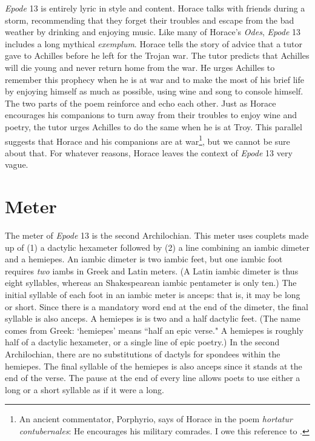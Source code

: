 \textit{Epode} 13 is entirely lyric in style and content.  Horace talks with friends during a storm, recommending that they forget their troubles and escape from the bad weather by drinking and enjoying music.  Like many of Horace's \textit{Odes}, \textit{Epode} 13 includes a long mythical \textit{exemplum}.  Horace tells the story of advice that a tutor gave to Achilles before he left for the Trojan war.  The tutor predicts that Achilles will die young and never return home from the war.  He urges Achilles to remember this prophecy when he is at war and to make the most of his brief life by enjoying himself as much as possible, using wine and song to console himself.  The two parts of the poem reinforce and echo each other.  Just as Horace encourages his companions to turn away from their troubles to enjoy wine and poetry, the tutor urges Achilles to do the same when he is at Troy.  This parallel suggests that Horace and his companions are at war\footnote{An ancient commentator, Porphyrio, says of Horace in the poem \textit{hortatur contubernales}: He encourages his military comrades.  I owe this reference to \citet[137]{kilpatrick1970}.}, but we cannot be sure about that. For whatever reasons, Horace leaves the context of \textit{Epode} 13 very vague.


\section*{Meter}

The meter of \textit{Epode} 13 is the second Archilochian. This meter uses couplets made up of (1) a dactylic hexameter followed by (2) a line combining an iambic dimeter and a hemiepes.  An iambic dimeter is two iambic feet, but one iambic foot requires \textit{two} iambs in Greek and Latin meters.  (A Latin iambic dimeter is thus eight syllables, whereas an Shakespearean iambic pentameter is only ten.)  The initial syllable of each foot in an iambic meter is anceps: that is, it may be long or short.  Since there is a mandatory word end at the end of the dimeter, the final syllable is also anceps.  A hemiepes is is two and a half dactylic feet.  (The name comes from Greek: `hemiepes' means ``half an epic verse."  A hemiepes is roughly half of a dactylic hexameter, or a single line of epic poetry.)  In the second Archilochian, there are no substitutions of dactyls for spondees within the hemiepes.  The final syllable of the hemiepes is also anceps since it stands at the end of the verse.  The pause at the end of every line allows poets to use either a long or a short syllable as if it were a long.

